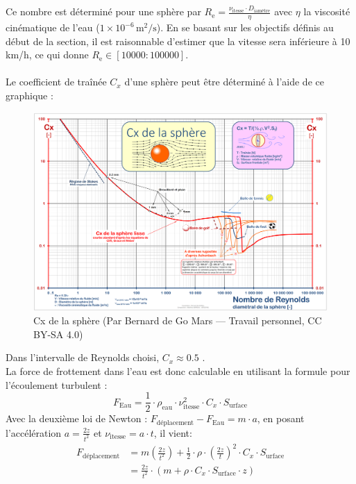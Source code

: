 \documentclass{article}
\begin{document}
\\\\
Ce nombre est déterminé pour une sphère par $R_{\text{e}} = \frac{\nu_{\text{itesse}} \cdot D_{\text{iamètre}}}{\eta}$ avec $\eta$ la viscosité cinématique de l'eau ($1 \times 10^{-6} \, \text{m}^2/\text{s}$). En se basant sur les objectifs définis au début de la section, il est raisonnable d'estimer que la vitesse sera inférieure à 10 km/h, ce qui donne $R_{\text{e}} \in [10000:100000]$.
\\
\\
Le coefficient de traînée $C_x$ d'une sphère peut être déterminé à l'aide de ce graphique :

\begin{figure}[H]
    \centering
    \includegraphics[width=0.7\linewidth]{Images/CX_SPHERE.png}
    \caption{Cx de la sphère \cite{ref7} (Par Bernard de Go Mars — Travail personnel, CC BY-SA 4.0)}
    \label{fig:Cx_sphere}
\end{figure}
\noindent
Dans l'intervalle de Reynolds choisi, $C_x \approx 0.5$ .
\\
La force de frottement dans l'eau est donc calculable en utilisant la formule pour l'écoulement turbulent :
\begin{equation}
F_{\text{Eau}} = \frac{1}{2} \cdot \rho_{\text{eau}} \cdot \nu_{\text{itesse}}^2 \cdot C_x \cdot S_{\text{urface}}
\end{equation}
Avec la deuxième loi de Newton : $F_{\text{déplacement}} - F_{\text{Eau}} = m \cdot a$, en posant l'accélération $a = \frac{2z}{t^2}$ et $\nu_{\text{itesse}} = a \cdot t$, il vient:
\begin{equation}
\begin{aligned}
F_{\text{déplacement}} &= m\left(\frac{2z}{t^2}\right) + \frac{1}{2} \cdot \rho \cdot \left(\frac{2z}{t}\right)^2 \cdot C_x \cdot S_{\text{urface}} \\
&= \frac{2z}{t^2} \cdot \left(m + \rho \cdot C_x \cdot S_{\text{urface}} \cdot z\right)
\end{aligned}
\label{eq:EquationMagEau}
\end{equation}
\end{document}

